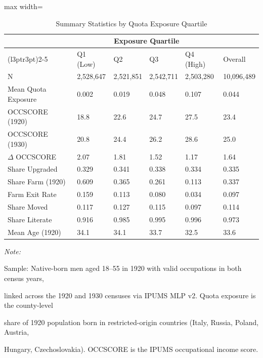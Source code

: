 \begin{table}[!h]
\centering
\caption{\label{tab:summary}Summary Statistics by Quota Exposure Quartile}
\centering
\begin{adjustbox}{max width=\textwidth}
\begin{threeparttable}
\footnotesize
\begin{tabular}[t]{llllll}
\toprule
\multicolumn{1}{c}{ } & \multicolumn{4}{c}{Exposure Quartile} & \multicolumn{1}{c}{ } \\
\cmidrule(l{3pt}r{3pt}){2-5}
  & Q1 (Low) & Q2 & Q3 & Q4 (High) & Overall\\
\midrule
N & 2,528,647 & 2,521,851 & 2,542,711 & 2,503,280 & 10,096,489\\
Mean Quota Exposure & 0.002 & 0.019 & 0.048 & 0.107 & 0.044\\
OCCSCORE (1920) & 18.8 & 22.6 & 24.7 & 27.5 & 23.4\\
OCCSCORE (1930) & 20.8 & 24.4 & 26.2 & 28.6 & 25.0\\
$\Delta$ OCCSCORE & 2.07 & 1.81 & 1.52 & 1.17 & 1.64\\
\addlinespace
Share Upgraded & 0.329 & 0.341 & 0.338 & 0.334 & 0.335\\
Share Farm (1920) & 0.609 & 0.365 & 0.261 & 0.113 & 0.337\\
Farm Exit Rate & 0.159 & 0.113 & 0.080 & 0.034 & 0.097\\
Share Moved & 0.117 & 0.127 & 0.115 & 0.097 & 0.114\\
Share Literate & 0.916 & 0.985 & 0.995 & 0.996 & 0.973\\
\addlinespace
Mean Age (1920) & 34.1 & 34.1 & 33.7 & 32.5 & 33.6\\
\bottomrule
\end{tabular}
\begin{tablenotes}
\item \textit{Note: } 
\item Sample: Native-born men aged 18--55 in 1920 with valid occupations in both census years,
\item linked across the 1920 and 1930 censuses via IPUMS MLP v2. Quota exposure is the county-level
\item share of 1920 population born in restricted-origin countries (Italy, Russia, Poland, Austria,
\item Hungary, Czechoslovakia). OCCSCORE is the IPUMS occupational income score.
\end{tablenotes}
\end{threeparttable}
\end{adjustbox}
\end{table}
